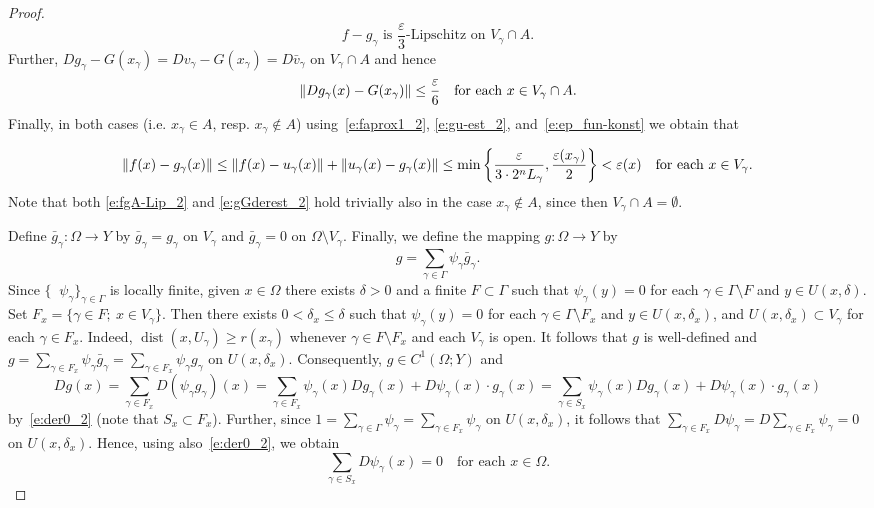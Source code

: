 \documentclass[a4paper,twoside,10pt,reqno,draft]{amsart}
\newenvironment{emshade}{%
  \snugshade
  \normalsize
}{%
  \endsnugshade
}
\theoremstyle{definition}
\theoremstyle{remark}
\newcommand\setsep{;\allowbreak\ } %
\newcommand\norm[1]{\mathopen\|#1\mathclose\|}
\newcommand\ga{\gamma}
\newcommand\Ga{\Gamma}
\newcommand\de{\delta}
\newcommand\ve{\varepsilon}
\newcommand\Om{\Omega}
\DeclareMathOperator{\suppo}{supp_o}
\DeclareMathOperator{\dist}{dist}
\begin{document}
\begin{proof}
\begin{equation}\label{e:fgA-Lip_2}
\text{$f-g_\ga$ is $\frac\ve3$-Lipschitz on $V_\ga\cap A$.}
\end{equation}
Further, $Dg_\ga-G(x_\ga)=Dv_\ga-G(x_\ga)=D\bar v_\ga$ on $V_\ga\cap A$ and hence
\begin{equation}\label{e:gGderest_2}
\norm{Dg_\ga(x)-G(x_\ga)}\le\frac\ve6\text{\quad for each $x\in V_\ga\cap A$.}
\end{equation}
Finally, in both cases (i.e. $x_\ga\in A$, resp. $x_\ga\notin A$) using~\eqref{e:faprox1_2}, \eqref{e:gu-est_2}, and~\eqref{e:ep_fun-konst} we obtain that
\begin{emshade}
\begin{equation}\label{e:faprox_2}
\norm{f(x)-g_\ga(x)}\le\norm{f(x)-u_\ga(x)}+\norm{u_\ga(x)-g_\ga(x)}\le\min\left\{\frac\ve{3\cdot2^nL_\ga},\frac{\ve(x_\ga)}2\right\}<\ve(x)\text{\quad for each $x\in V_\ga$.}
\end{equation}
\end{emshade}\noindent
Note that both \eqref{e:fgA-Lip_2} and \eqref{e:gGderest_2} hold trivially also in the case $x_\ga\notin A$, since then $V_\ga\cap A=\emptyset$.

Define $\bar g_\ga\colon\Om\to Y$ by $\bar g_\ga=g_\ga$ on $V_\ga$ and $\bar g_\ga=0$ on $\Om\setminus V_\ga$.
Finally, we define the mapping $g\colon\Om\to Y$ by
\[
g=\sum_{\ga\in\Ga}\psi_\ga\bar g_\ga.
\]
Since $\{\suppo\psi_\ga\}_{\ga\in\Ga}$ is locally finite, given $x\in\Om$ there exists $\de>0$ and a finite $F\subset\Ga$ such that $\psi_\ga(y)=0$ for each $\ga\in\Ga\setminus F$ and $y\in U(x,\de)$.
Set $F_x=\{\ga\in F\setsep x\in V_\ga\}$.
Then there exists $0<\de_x\le\de$ such that $\psi_\ga(y)=0$ for each $\ga\in\Ga\setminus F_x$ and $y\in U(x,\de_x)$, and $U(x,\de_x)\subset V_\ga$ for each $\ga\in F_x$.
Indeed, $\dist(x,U_\ga)\ge r(x_\ga)$ whenever $\ga\in F\setminus F_x$ and each $V_\ga$ is open.
It follows that $g$ is well-defined and $g=\sum_{\ga\in F_x}\psi_\ga\bar g_\ga=\sum_{\ga\in F_x}\psi_\ga g_\ga$ on $U(x,\de_x)$.
Consequently, $g\in C^1(\Om;Y)$ and
\begin{equation}\label{e:derg_2}
Dg(x)=\sum_{\ga\in F_x}D(\psi_\ga g_\ga)(x)=\sum_{\ga\in F_x}\psi_\ga(x)Dg_\ga(x)+D\psi_\ga(x)\cdot g_\ga(x)=\sum_{\ga\in S_x}\psi_\ga(x)Dg_\ga(x)+D\psi_\ga(x)\cdot g_\ga(x)
\end{equation}
by~\eqref{e:der0_2} (note that $S_x\subset F_x$).
Further, since $1=\sum_{\ga\in\Ga}\psi_\ga=\sum_{\ga\in F_x}\psi_\ga$ on $U(x,\de_x)$, it follows that $\sum_{\ga\in F_x}D\psi_\ga=D\sum_{\ga\in F_x}\psi_\ga=0$ on $U(x,\de_x)$.
Hence, using also~\eqref{e:der0_2}, we obtain
\begin{equation}\label{e:sum_der=0_2}
\sum_{\ga\in S_x}D\psi_\ga(x)=0\quad\text{for each $x\in\Om$.}
\end{equation}


\end{proof}
\end{document}
